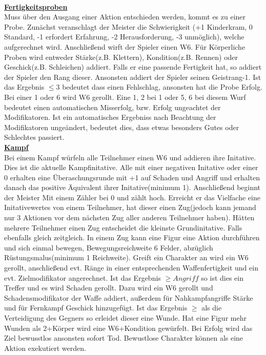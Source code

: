\documentclass[twoside,a4paper]{minimal}
\begin{document}
\begin{multicols*}{3}
\textbf{\uline{\\Fertigkeitsproben}}
\\Muss über den Ausgang einer Aktion entschieden werden, kommt es zu einer Probe. Zunächst veranschlagt der Meister die Schwierigkeit (+1 Kinderkram, 0 Standard, -1 erfordert Erfahrung, -2 Herausforderung, -3 unmöglich), welche aufgerechnet wird. Anschließend wirft der Spieler einen W6. Für Körperliche Proben wird entweder Stärke(z.B. Klettern), Kondition(z.B. Rennen) oder Geschick(z.B. Schleichen) addiert. Falls er eine passende Fertigkeit hat, so addiert der Spieler den Rang dieser. Ansonsten addiert der Spieler seinen Geistrang-1. Ist das Ergebnis $\leq 3$ bedeutet dass einen Fehlschlag, ansonsten hat die Probe Erfolg. Bei einer 1 oder 6 wird W6 gerollt. Eine 1, 2 bei 1 oder 5, 6 bei diesem Wurf bedeutet einen automatischen Misserfolg, bzw. Erfolg ungeachtet der Modifikatoren. Ist ein automatisches Ergebniss nach Beachtung der Modifikatoren ungeändert, bedeutet dies, dass etwas besonders Gutes oder Schlechtes passiert.
\textbf{\uline{\\Kampf}}
\\Bei einem Kampf würfeln alle Teilnehmer einen W6 und addieren ihre Initative. Dies ist die aktuelle Kampfinitative. Alle mit einer negativen Initative oder einer 0 erhalten eine Überaschungsrunde mit +1 auf Schaden und Angriff und erhalten danach das positive Äquivalent ihrer Initative(minimum 1). Anschließend beginnt der Meister Mit einem Zähler bei 0 und zählt hoch. Erreicht er das Vielfache eine Initativewertes von einem Teilnehmer, hat dieser einen Zug(jedoch kann jemand nur 3 Aktionen vor dem nächsten Zug aller anderen Teilnehmer haben). Hätten mehrere Teilnehmer einen Zug entscheidet die kleinste Grundinitative. Falls ebenfalls gleich zeitgleich.
In einem Zug kann eine Figur eine Aktion durchführen und sich einmal bewegen, Bewegungsreichweite 6 Felder, abzüglich Rüstungsmalus(minimum 1 Reichweite). Greift ein Charakter an wird ein W6 gerollt, anschließend evt. Ränge in einer entsprechenden Waffenfertigkeit und ein evt. Zielmodifikator angerechnet. Ist das Ergebnis $\geq Angriff$ so ist dies ein Treffer und es wird Schaden gerollt. Dazu wird ein W6 gerollt und Schadensmodifikator der Waffe addiert, außerdem für Nahkampfangriffe Stärke und für Fernkampf Geschick hinzugefügt. Ist das Ergebnis $\geq$ als die Verteidigung des Gegners so erleidet dieser eine Wunde. Hat eine Figur mehr Wunden als 2+Körper wird eine W6+Kondition gewürfelt. Bei Erfolg wird das Ziel bewusstlos ansonsten sofort Tod. Bewustlose Charakter können als eine Aktion exekutiert werden.

\end{multicols*}
\end{document}

